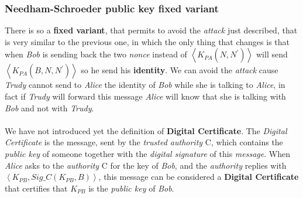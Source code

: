 \documentclass{article}
\begin{document}
\subsubsection{Needham-Schroeder public key fixed variant}
There is so a \textbf{fixed variant}, that permits to avoid the \emph{attack} just described, that is very similar to the previous one, in which the only thing that changes is that when \emph{Bob} is sending back the two \emph{nonce} instead of  $\left \langle K_{PA}(N,N^{'}) \right \rangle$ will send  $\left \langle K_{PA}(B,N,N^{'}) \right \rangle$ so he send his \textbf{identity}. We can avoid the \emph{attack} cause \emph{Trudy} cannot send to \emph{Alice} the identity of \emph{Bob} while she is talking to \emph{Alice}, in fact if \emph{Trudy} will forward this message \emph{Alice} will know that she is talking with \emph{Bob} and not with \emph{Trudy}. \\\\
We have not introduced yet the definition of \textbf{Digital Certificate}. The \emph{Digital Certificate} is the message, sent by the \emph{trusted authority} C, which contains the \emph{public key} of someone together with the \emph{digital signature} of this \emph{message}. When \emph{Alice} asks to the \emph{authority} C for the key of \emph{Bob}, and the \emph{authority} replies with $\left \langle K_{PB}, Sig\_C(K_{PB},B)\right \rangle$, this message can be considered a \textbf{Digital Certificate} that certifies that $K_{PB}$ is the \emph{public key} of \emph{Bob}.
\clearpage
\end{document}
